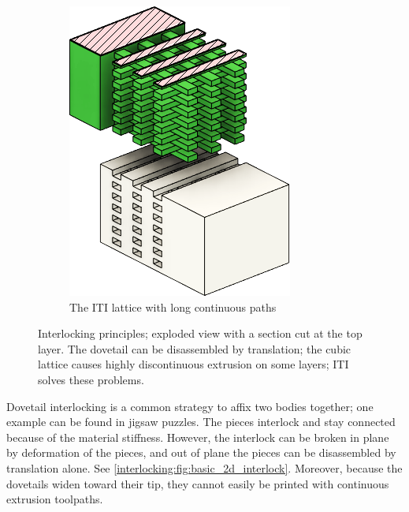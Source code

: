 \begin{figure}
\begin{subfigure}[B]{.36\columnwidth}
		\includegraphics[height=\figheight]{sources-method-basic_lattice.png}
		\caption{The ITI lattice with long continuous paths}
		\label{interlocking:fig:basic_structure_single_mat}
	\end{subfigure}
	\caption{Interlocking principles; exploded view with a section cut at the top layer. The dovetail can be disassembled by translation; the cubic lattice causes highly discontinuous extrusion on some layers;  ITI solves these problems.}
	\label{interlocking:fig:basic_structure}
\end{figure}





Dovetail interlocking is a common strategy to affix two bodies together;
one example can be found in jigsaw puzzles.
The pieces interlock and stay connected because of the material stiffness.
However, the interlock can be broken in plane by deformation of the pieces,
and out of plane the pieces can be disassembled by translation alone.
See \cref{interlocking:fig:basic_2d_interlock}.
Moreover, because the dovetails widen toward their tip, they cannot easily be printed with continuous extrusion toolpaths.

